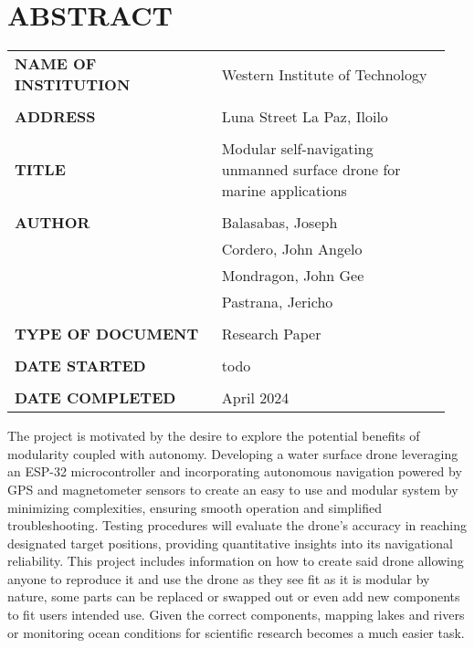 \setcounter{page}{1}

\chapter*{ABSTRACT}

\vspace{-1cm}
\begin{tabularx}{0.95\linewidth}{@{}p{0.45\linewidth}p{0.50\linewidth}@{}@{}}
\Large {\bf NAME OF INSTITUTION} & \Large Western Institute of Technology \\
\\
\Large {\bf ADDRESS} & \Large Luna Street La Paz, Iloilo \\
\\
\Large{\bf TITLE} & \Large Modular self-navigating unmanned surface drone for marine applications \\
\\
\Large {\bf AUTHOR} & \Large Balasabas, Joseph \\
 & \Large Cordero, John Angelo \\ 
 & \Large Mondragon, John Gee \\
 & \Large Pastrana, Jericho \\
\\
\Large {\bf TYPE OF DOCUMENT} & \Large Research Paper \\
\\
\Large {\bf DATE STARTED} & \Large todo \\
\\
\Large {\bf DATE COMPLETED} & \Large April 2024

\end{tabularx}


\Large The project is motivated by the desire to explore the potential benefits of modularity coupled with autonomy. Developing a water surface 
drone leveraging an ESP-32 microcontroller and incorporating autonomous navigation powered by GPS and magnetometer sensors to create an easy
to use and modular system by minimizing complexities, ensuring smooth operation and simplified troubleshooting. Testing procedures will 
evaluate the drone's accuracy in reaching designated target positions, providing quantitative insights into its navigational reliability. 
This project includes information on how to create said drone allowing anyone to reproduce it and use the drone as they see fit as it is 
modular by nature, some parts can be replaced or swapped out or even add new components to fit users intended use. Given the correct 
components, mapping lakes and rivers or monitoring ocean conditions for scientific research becomes a much easier task.
